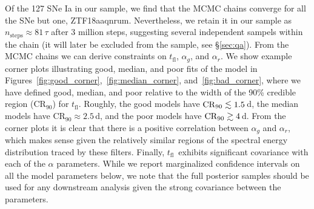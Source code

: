 \documentclass[twocolumn]{aastex63}
\newcommand{\tfl}{$t_\mathrm{fl}$}
\begin{document}
Of the 127 SNe Ia in our sample, we find that the MCMC chains converge for
all the SNe but one, ZTF18aaqnrum. Nevertheless, we retain it in our sample
as $n_\mathrm{steps} \approx 81 \,\tau$ after 3 million steps, suggesting
several independent sampels within the chain (it will later be excluded from
the sample, see \S\ref{sec:qa}). From the MCMC chains we can derive
constraints on \tfl, $\alpha_g$, and $\alpha_r$. We show example corner plots
illustrating good, median, and poor fits of the model in
Figures~\ref{fig:good_corner},~\ref{fig:median_corner},
and~\ref{fig:bad_corner}, where we have defined good, median, and poor
relative to the width of the 90\% credible region ($\mathrm{CR}_{90}$) for
\tfl. Roughly, the good models have $\mathrm{CR}_{90} \lesssim 1.5$\,d, the median
models have $\mathrm{CR}_{90} \approx 2.5$\,d, and the poor models have
$\mathrm{CR}_{90} \gtrsim 4$\,d. From the corner plots it is clear that there is
a positive correlation between $\alpha_g$ and $\alpha_r$, which makes sense
given the relatively similar regions of the spectral energy distribution
traced by these filters. Finally, \tfl\ exhibits significant covariance with
each of the $\alpha$ parameters. While we report marginalized confidence
intervals on all the model parameters below, we note that the full posterior
samples should be used for any downstream analysis given the strong
covariance between the parameters.
\end{document}
